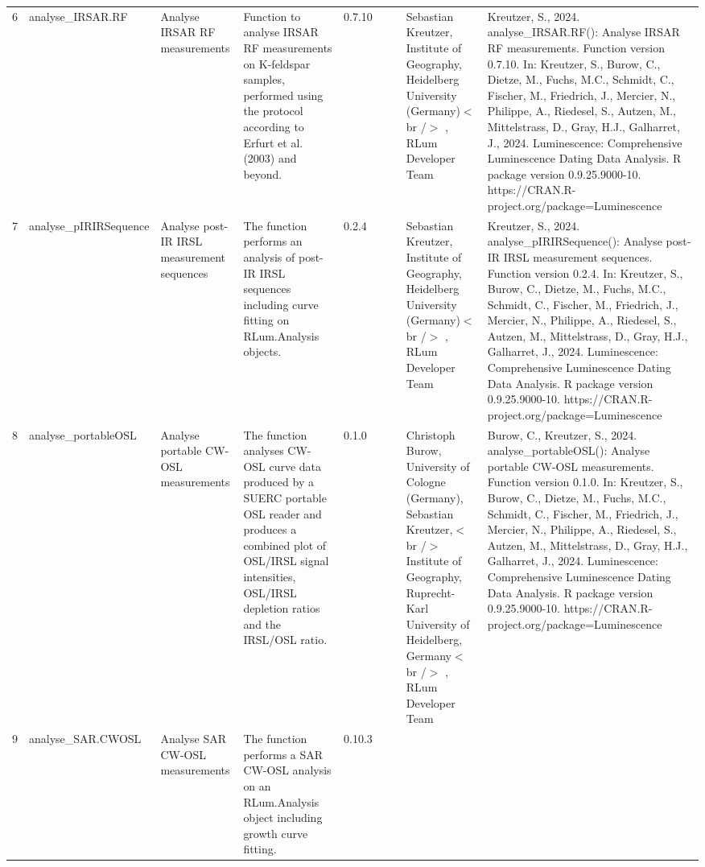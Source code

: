\begin{table}[ht]
\begin{tabular}{rllllllll}
  6 & analyse\_IRSAR.RF & Analyse IRSAR RF measurements & Function to analyse IRSAR RF measurements on K-feldspar samples, performed using the protocol according to Erfurt et al. (2003) and beyond. & 0.7.10
 &  &  & Sebastian Kreutzer, Institute of Geography, Heidelberg University (Germany)$<$br /$>$ , RLum Developer Team & Kreutzer, S., 2024. analyse\_IRSAR.RF(): Analyse IRSAR RF measurements. Function version 0.7.10. In: Kreutzer, S., Burow, C., Dietze, M., Fuchs, M.C., Schmidt, C., Fischer, M., Friedrich, J., Mercier, N., Philippe, A., Riedesel, S., Autzen, M., Mittelstrass, D., Gray, H.J., Galharret, J., 2024. Luminescence: Comprehensive Luminescence Dating Data Analysis. R package version 0.9.25.9000-10. https://CRAN.R-project.org/package=Luminescence
 \\ 
  7 & analyse\_pIRIRSequence & Analyse post-IR IRSL measurement sequences & The function performs an analysis of post-IR IRSL sequences including curve fitting on  RLum.Analysis  objects. & 0.2.4
 &  &  & Sebastian Kreutzer, Institute of Geography, Heidelberg University (Germany)$<$br /$>$ , RLum Developer Team & Kreutzer, S., 2024. analyse\_pIRIRSequence(): Analyse post-IR IRSL measurement sequences. Function version 0.2.4. In: Kreutzer, S., Burow, C., Dietze, M., Fuchs, M.C., Schmidt, C., Fischer, M., Friedrich, J., Mercier, N., Philippe, A., Riedesel, S., Autzen, M., Mittelstrass, D., Gray, H.J., Galharret, J., 2024. Luminescence: Comprehensive Luminescence Dating Data Analysis. R package version 0.9.25.9000-10. https://CRAN.R-project.org/package=Luminescence
 \\ 
  8 & analyse\_portableOSL & Analyse portable CW-OSL measurements & The function analyses CW-OSL curve data produced by a SUERC portable OSL reader and produces a combined plot of OSL/IRSL signal intensities, OSL/IRSL depletion ratios and the IRSL/OSL ratio. & 0.1.0
 &  &  & Christoph Burow, University of Cologne (Germany), Sebastian Kreutzer,$<$br /$>$ Institute of Geography, Ruprecht-Karl University of Heidelberg, Germany$<$br /$>$ , RLum Developer Team & Burow, C., Kreutzer, S., 2024. analyse\_portableOSL(): Analyse portable CW-OSL measurements. Function version 0.1.0. In: Kreutzer, S., Burow, C., Dietze, M., Fuchs, M.C., Schmidt, C., Fischer, M., Friedrich, J., Mercier, N., Philippe, A., Riedesel, S., Autzen, M., Mittelstrass, D., Gray, H.J., Galharret, J., 2024. Luminescence: Comprehensive Luminescence Dating Data Analysis. R package version 0.9.25.9000-10. https://CRAN.R-project.org/package=Luminescence
 \\ 
  9 & analyse\_SAR.CWOSL & Analyse SAR CW-OSL measurements & The function performs a SAR CW-OSL analysis on an RLum.Analysis  object including growth curve fitting. & 0.10.3

\end{tabular}
\end{table}
